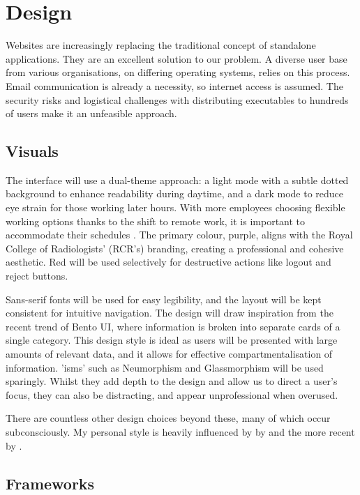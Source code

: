 \chapter{Design} \label{Design}
\begin{spacing}{0.8}
\small
Websites are increasingly replacing the traditional concept of standalone applications. They are an excellent solution to our problem. A diverse user base from various organisations, on differing operating systems, relies on this process. Email communication is already a necessity, so internet access is assumed. The security risks and logistical challenges with distributing executables to hundreds of users make it an unfeasible approach.
\end{spacing}
\vspace{-8pt}
\section{Visuals}
The interface will use a dual-theme approach: a light mode with a subtle dotted background to enhance readability during daytime, and a dark mode to reduce eye strain for those working later hours. With more employees choosing flexible working options thanks to the shift to remote work, it is important to accommodate their schedules \parencite{cipd2023flexible}. The primary colour, purple, aligns with the Royal College of Radiologists' (RCR’s) branding, creating a professional and cohesive aesthetic. Red will be used selectively for destructive actions like logout and reject buttons.

Sans-serif fonts will be used for easy legibility, and the layout will be kept consistent for intuitive navigation. The design will draw inspiration from the recent trend of Bento UI, where information is broken into separate cards of a single category. This design style is ideal as users will be presented with large amounts of relevant data, and it allows for effective compartmentalisation of information. 'isms' such as Neumorphism and Glassmorphism will be used sparingly. Whilst they add depth to the design and allow us to direct a user's focus, they can also be distracting, and appear unprofessional when overused.

There are countless other design choices beyond these, many of which occur subconsciously. My personal style is heavily influenced by  by \textcite{muller-brockmann_grid_1981} and the more recent  by \textcite{wathan_refactoring_2018}.
\section{Frameworks}
